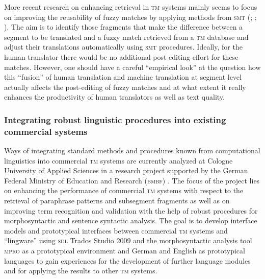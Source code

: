\documentclass[output=paper]{LSP/langsci}
\begin{document}
More recent research on enhancing retrieval in \textsc{tm} systems mainly seems to focus on improving the reusability of fuzzy matches by applying methods from \textsc{smt} (\citealt{Biçici2008}; \citealt{Zhechev2010}; \citealt{KoehnSenellart2010}). The aim is to identify those fragments that make the difference between a segment to be translated and a fuzzy match retrieved from a \textsc{tm} database and adjust their translations automatically using \textsc{smt} procedures. Ideally, for the human translator there would be no additional post-editing effort for these matches. However, one should have a careful ``empirical look'' at the question how this ``fusion'' of human translation and machine translation at segment level actually affects the post-editing of fuzzy matches and at what extent it really enhances the productivity of human translators as well as text quality.

\subsubsection{Integrating robust linguistic procedures into existing commercial systems}\label{sec:reinke:3.2.2}
 
Ways of integrating standard methods and procedures known from computational linguistics into commercial \textsc{tm} systems are currently analyzed at Cologne University of Applied Sciences in a research project supported by the German Federal Ministry of Education and Research (\textsc{bmbf}) \citep{AzzanoEtAl2011}. The focus of the project lies on enhancing the performance of commercial \textsc{tm} systems with respect to the retrieval of paraphrase patterns and subsegment fragments as well as on improving term recognition and validation with the help of robust procedures for morphosyntactic and sentence syntactic analysis. The goal is to develop interface models and prototypical interfaces between commercial \textsc{tm} systems and ``lingware'' using \textsc{sdl} Trados Studio 2009 and the morphosyntactic analysis tool \textsc{mpro} \citep{Maas2009} as a prototypical environment and German and English as prototypical languages to gain experiences for the development of further language modules and for applying the results to other \textsc{tm} systems.
 
\end{document}
